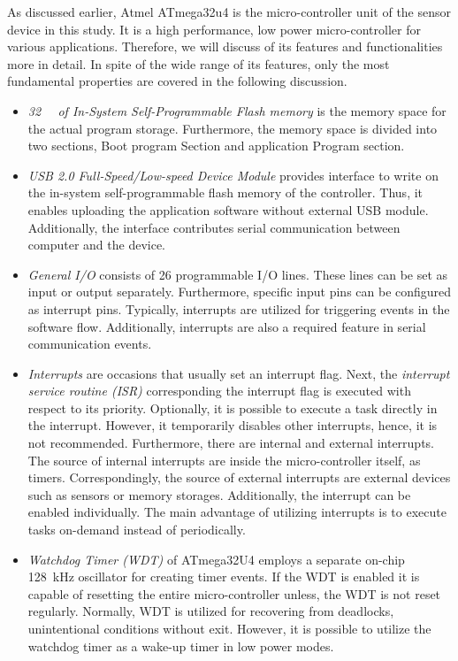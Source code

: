 \documentclass[english,12pt,a4paper,pdftex,elec,utf8]{aaltothesis}
\begin{document}
As discussed earlier, Atmel ATmega32u4 \cite{atmega32u4datasheet} is the micro-controller unit of the sensor device in this study. It is a high performance, low power micro-controller for various applications. Therefore, we will discuss of its features and functionalities more in detail. In spite of the wide range of its features, only the most fundamental properties are covered in the following discussion.


\begin{itemize}
\item \textit{\SI{32}{\kilo\byte} of In-System Self-Programmable Flash memory} is the memory space for the actual program storage. Furthermore, the memory space is divided into two sections, Boot program Section and application Program section. 

\item \textit{USB 2.0 Full-Speed/Low-speed Device Module} provides interface to write on the in-system self-programmable flash memory of the controller. Thus, it enables uploading the application software without external USB module. Additionally, the interface contributes serial communication between computer and the device.

\item \textit{General I/O} consists of 26 programmable I/O lines. These lines can be set as input or output separately. Furthermore, specific input pins can be configured as interrupt pins. Typically, interrupts are utilized for triggering events in the software flow. Additionally, interrupts are also a required feature in serial communication events.

\item \textit{Interrupts} are occasions that usually set an interrupt flag. Next, the \textit{interrupt service routine (ISR)} corresponding the interrupt flag is executed with respect to its priority. Optionally, it is possible to execute a task directly in the interrupt. However, it temporarily disables other interrupts, hence, it is not recommended. Furthermore, there are internal and external interrupts. The source of internal interrupts are inside the micro-controller itself, as timers. Correspondingly, the source of external interrupts are external devices such as sensors or memory storages. Additionally, the interrupt can be enabled individually. The main advantage of utilizing interrupts is to execute tasks on-demand instead of periodically.

\item \textit{Watchdog Timer (WDT)} of ATmega32U4 employs a separate on-chip \SI{128}{\kilo \hertz} oscillator for creating timer events. If the WDT is enabled it is capable of resetting the entire micro-controller unless, the WDT is not reset regularly. Normally, WDT is utilized for recovering from deadlocks, unintentional conditions without exit. However, it is possible to utilize the watchdog timer as a wake-up timer in low power modes.



\end{itemize}
\end{document}

